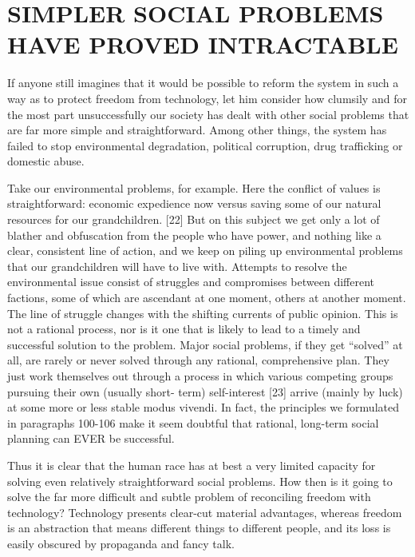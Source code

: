 \chapter{SIMPLER SOCIAL PROBLEMS HAVE PROVED INTRACTABLE}

 If anyone still imagines that it would be possible to reform the system in such a way as to protect freedom from technology, let him consider how clumsily and for the most part unsuccessfully our society has dealt with other social problems that are far more simple and straightforward. Among other things, the system has failed to stop environmental degradation, political corruption, drug trafficking or domestic abuse.

 Take our environmental problems, for example. Here the conflict of values is straightforward: economic expedience now versus saving some of our natural resources for our grandchildren. [22] But on this subject we get only a lot of blather and obfuscation from the people who have power, and nothing like a clear, consistent line of action, and we keep on piling up environmental problems that our grandchildren will have to live with. Attempts to resolve the environmental issue consist of struggles and compromises between different factions, some of which are ascendant at one moment, others at another moment. The line of struggle changes with the shifting currents of public opinion. This is not a rational process, nor is it one that is likely to lead to a timely and successful solution to the problem. Major social problems, if they get “solved” at all, are rarely or never solved through any rational, comprehensive plan. They just work themselves out through a process in which various competing groups pursuing their own (usually short- term) self-interest [23] arrive (mainly by luck) at some more or less stable modus vivendi. In fact, the principles we formulated in paragraphs 100-106 make it seem doubtful that rational, long-term social planning can EVER be successful.

 Thus it is clear that the human race has at best a very limited capacity for solving even relatively straightforward social problems. How then is it going to solve the far more difficult and subtle problem of reconciling freedom with technology? Technology presents clear-cut material advantages, whereas freedom is an abstraction that means different things to different people, and its loss is easily obscured by propaganda and fancy talk.

